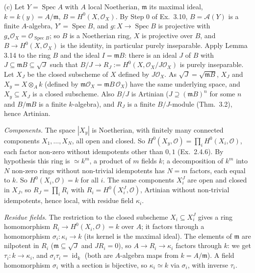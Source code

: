 \documentclass[11pt]{article}
\begin{document}
(c) Let $Y=\operatorname{Spec}A$ with $A$ local Noetherian, $\mathfrak m$ its maximal ideal, $k=k(y)=A/\mathfrak m$, $B=H^0(X,\mathcal O_X)$. By Step 0 of Ex.~3.10, $B=\mathcal A(Y)$ is a finite $A$-algebra, $Y'=\operatorname{Spec}B$, and $g:X\to\operatorname{Spec}B$ is projective with $g_*\mathcal O_X=\mathcal O_{\operatorname{Spec}B}$; so $B$ is a Noetherian ring, $X$ is projective over $B$, and $B\to H^0(X,\mathcal O_X)$ is the identity, in particular purely inseparable. Apply Lemma 3.14 to the ring $B$ and the ideal $I=\mathfrak mB$: there is an ideal $J$ of $B$ with $J\subseteq\mathfrak mB\subseteq\sqrt J$ such that $B/J\to R_J:=H^0(X,\mathcal O_X/J\mathcal O_X)$ is purely inseparable. Let $X_J$ be the closed subscheme of $X$ defined by $J\mathcal O_X$. As $\sqrt J=\sqrt{\mathfrak mB}$, $X_J$ and $X_y=X\otimes_Ak$ (defined by $\mathfrak m\mathcal O_X=\mathfrak mB\,\mathcal O_X$) have the same underlying space, and $X_y\subseteq X_J$ is a closed subscheme. Also $B/J$ is Artinian ($J\supseteq(\mathfrak mB)^n$ for some $n$ and $B/\mathfrak mB$ is a finite $k$-algebra), and $R_J$ is a finite $B/J$-module (Thm.~3.2), hence Artinian.

\emph{Components.} The space $|X_y|$ is Noetherian, with finitely many connected components $X_1,\dots,X_N$, all open and closed. So $H^0(X_y,\mathcal O)=\prod_iH^0(X_i,\mathcal O)$, each factor non-zero without idempotents other than $0,1$ (Ex.~2.4.6). By hypothesis this ring is $\simeq k^m$, a product of $m$ fields $k$; a decomposition of $k^m$ into $N$ non-zero rings without non-trivial idempotents has $N=m$ factors, each equal to $k$. So $H^0(X_i,\mathcal O)=k$ for all $i$. The same components $X_i^J$ are open and closed in $X_J$, so $R_J=\prod_iR_i$ with $R_i=H^0(X_i^J,\mathcal O)$, Artinian without non-trivial idempotents, hence local, with residue field $\kappa_i$.

\emph{Residue fields.} The restriction to the closed subscheme $X_i\subseteq X_i^J$ gives a ring homomorphism $R_i\to H^0(X_i,\mathcal O)=k$ over $A$; it factors through a homomorphism $\sigma_i:\kappa_i\to k$ (its kernel is the maximal ideal). The elements of $\mathfrak m$ are nilpotent in $R_i$ ($\mathfrak m\subseteq\sqrt J$ and $JR_i=0$), so $A\to R_i\to\kappa_i$ factors through $k$: we get $\tau_i:k\to\kappa_i$, and $\sigma_i\tau_i=\operatorname{id}_k$ (both are $A$-algebra maps from $k=A/\mathfrak m$). A field homomorphism $\sigma_i$ with a section is bijective, so $\kappa_i\simeq k$ via $\sigma_i$, with inverse $\tau_i$.
\end{document}
